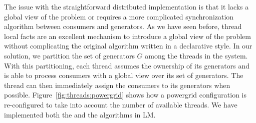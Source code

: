 The issue with the straightforward distributed implementation is that it lacks a
global view of the problem or requires a more complicated synchronization
algorithm between consumers and generators. As we have seen before, thread local
facts are an excellent mechanism to introduce a global view of the problem
without complicating the original algorithm written in a declarative style.  In
our solution, we partition the set of generators $G$ among the threads in the
system. With this partitioning, each thread assumes the ownership of its
generators and is able to process consumers with a global view over its set of
generators. The thread can then immediately assign the consumers to its
generators when possible. Figure~\ref{fig:threads:powergrid} shows how a powergrid
configuration is re-configured to take into account the number of available
threads. We have implemented both the  and the 
algorithms in LM.


